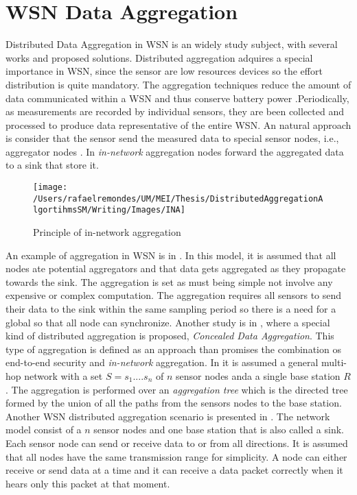 \section{WSN Data Aggregation}
Distributed Data Aggregation in WSN is an widely study subject, with several works and proposed solutions. Distributed aggregation adquires a special importance in WSN, since the sensor are low resources devices so the effort distribution is quite mandatory. The aggregation techniques reduce the amount of data communicated within a WSN and thus conserve battery power \cite{castelluccia2005efficient}.Periodically, as measurements are recorded by individual sensors, they are been collected and processed to produce data representative of the entire WSN.  An natural approach is consider that the sensor send the measured data to special sensor nodes, i.e., aggregator nodes \cite{castelluccia2005efficient}. In \textit{in-network} aggregation nodes forward the aggregated data to a sink that store it.\\
\begin{figure}[h]
\centering
\texttt{[image: /Users/rafaelremondes/UM/MEI/Thesis/DistributedAggregationAlgortihmsSM/Writing/Images/INA]}
\caption{\label{fig:INAaggregation} Principle of in-network aggregation}
\end{figure}
An example of  aggregation in WSN is in  \cite{castelluccia2005efficient}. In this model, it is assumed that all nodes ate potential aggregators and that data gets aggregated as they propagate towards the sink. The aggregation is set as must being simple not involve any expensive or complex computation. The aggregation requires all sensors to send their data to the sink within the same sampling period so there is a need for a global so that all node can synchronize. Another study is in \cite{Girao2004c}, where a special kind of distributed aggregation is proposed, \textit{Concealed Data Aggregation}. This type of aggregation is defined as an approach than promises the combination os end-to-end security and \textit{in-network} aggregation. In \cite{chan2006secure} it is assumed a general multi-hop network with a set $S={s_1....s_n}$ of $n$ sensor nodes anda a single base station $R$. The aggregation is performed over an \textit{aggregation tree} which is the directed tree formed by the union of all the paths from the sensors nodes to the base station. Another WSN distributed aggregation scenario is presented in \cite{yu2009distributed}. The network model consist of a $n$ sensor nodes and one base station that is also called a sink. Each sensor node can send or receive data to or from all directions. It is assumed that all nodes have the same transmission range for simplicity. A node can either receive or send data at a time and it can receive a data packet correctly when it hears only this packet at that moment.


